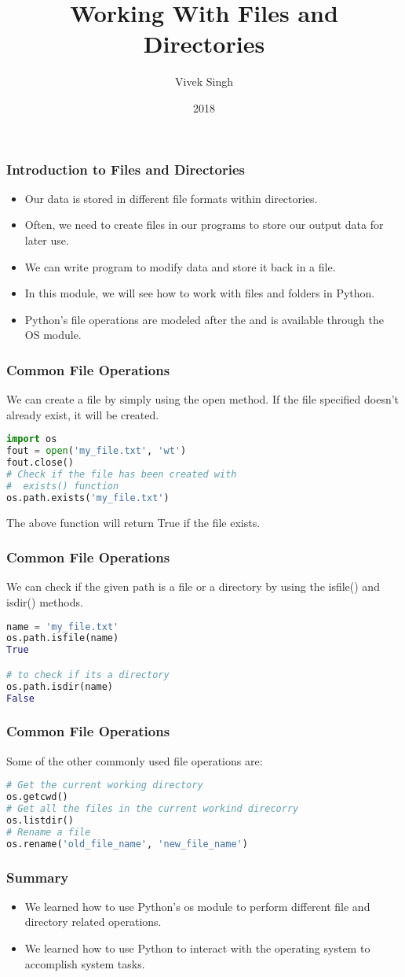 \documentclass{beamer}
\title{Working With Files and Directories}
\author{Vivek Singh}
\institute{Information Systems Decision Sciences (ISDS)\\
MUMA College of Business\\
University of South Florida \\
Tampa, Florida}
\date{2018}
\begin{document}
\frame{\titlepage}

\begin{frame}
\frametitle{Introduction to Files and Directories}
\begin{itemize}
\item Our data is stored in different file formats within directories.
\item Often, we need to create files in our programs to store our output data for later use.
\item We can write program to modify data and store it back in a file.
\item In this module, we will see how to work with files and folders in Python.
\item Python's file operations are modeled after the \textit{\color{blue}{Unix System}} and is available through the OS module.
\end{itemize}
\end{frame}

\begin{frame}[fragile]
\frametitle{Common File Operations}
We can create a file by simply using the open method. If the file specified doesn't already exist, it will be created.
\begin{lstlisting}[language=Python]
import os
fout = open('my_file.txt', 'wt')
fout.close()
# Check if the file has been created with 
#  exists() function
os.path.exists('my_file.txt')

\end{lstlisting}
The above function will return {\color{blue} True} if the file exists.
\end{frame}

\begin{frame}[fragile]
\frametitle{Common File Operations}
We can check if the given path is a file or a directory by using the isfile() and isdir() methods.
\begin{lstlisting}[language=Python]
name = 'my_file.txt'
os.path.isfile(name)
True

# to check if its a directory
os.path.isdir(name)
False
\end{lstlisting}
\end{frame}


\begin{frame}[fragile]
\frametitle{Common File Operations}
Some of the other commonly used file  operations are:
\begin{lstlisting}[language=Python]
# Get the current working directory
os.getcwd()
# Get all the files in the current workind direcorry
os.listdir()
# Rename a file
os.rename('old_file_name', 'new_file_name')
\end{lstlisting}

\end{frame}

\begin{frame}
\frametitle{Summary}
\begin{itemize}
\item We learned how to use Python's os module to perform different file and directory related operations.
\item We learned how to use Python to interact with the operating system to accomplish system tasks.

\end{itemize}
\end{frame}
\end{document}
